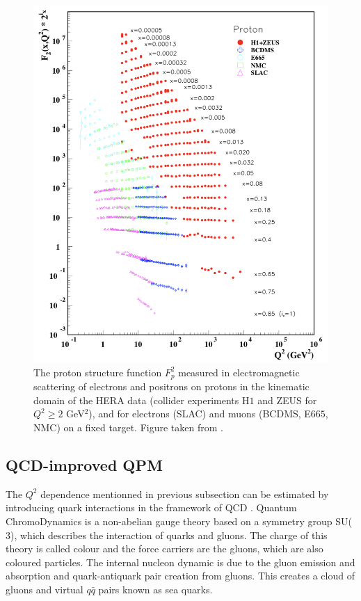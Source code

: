 \begin{figure}[!h]
  \centering
	\includegraphics[scale=0.65]{./gfx/F2.png}
	\caption{The proton structure function $F^2_p$ measured in electromagnetic scattering of electrons and positrons on protons in the kinematic domain of the HERA data (collider experiments H$1$ and ZEUS for $Q^2 \geq 2$ GeV$^2$), and for electrons (SLAC) and muons (BCDMS, E$665$, NMC) on a fixed target. Figure taken from \cite{PDG}.}
	\label{pic:F2}
\end{figure}

\subsection{QCD-improved QPM}

The $Q^2$ dependence mentionned in previous subsection can be estimated by introducing quark interactions in the framework of QCD \cite{DISmeas,PICH}. Quantum ChromoDynamics is a non-abelian gauge theory based on a symmetry group SU($3$), which describes the interaction of quarks and gluons. The charge of this theory is called colour and the force carriers are the gluons, which are also coloured particles. The internal nucleon dynamic is due to the gluon emission and absorption and quark-antiquark pair creation from gluons. This creates a cloud of gluons and virtual $q\bar{q}$ pairs known as sea quarks.

